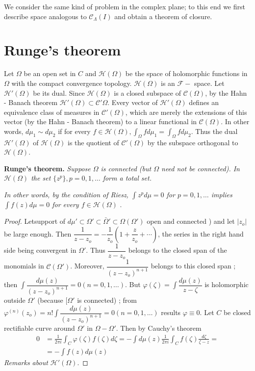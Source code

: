 We consider the same kind of problem in the complex plane; to this end
we first describe space analogous to $\mathscr{C}_\Lambda (I)$ and
obtain a theorem of closure. 

\section{Runge's theorem}\label{chap8:sec2}%

Let $\Omega$ be an open set in $C$ and $\mathscr{H}(\Omega)$ be the
space of holomorphic functions in $\Omega$ with the compact
convergence topology. $\mathscr{H}(\Omega)$ is an $\mathcal{F}-$
space. Let $\mathscr{H}' (\Omega)$ be its dual. Since
$\mathscr{H}(\Omega)$ is a closed subspace of $\mathscr{C}(\Omega)$,
by the Hahn - Banach theorem $\mathscr{H}' (\Omega) \subset
\mathscr{C}' \Omega$. Every vector of $\mathscr{H}'(\Omega)$ defines
an equivalence class of measures in $\mathscr{C}'(\Omega)$, which are
merely the extensions of this vector (by the Hahn - Banach theorem) to
a linear functional in $\mathscr{C}(\Omega)$. In other words, $d \mu_1
\sim d \mu_2$ if for every $f \in \mathscr{H}(\Omega), \int_\Omega f d
\mu_1 = \int_\Omega f d \mu_2$. Thus the dual $\mathscr{H}'(\Omega)$
of $\mathscr{H}(\Omega)$ is the quotient of $\mathscr{C}'(\Omega)$ by
the subspace orthogonal to $\mathscr{H}(\Omega)$. 

\medskip
\noindent
\textbf{Runge's theorem.} \textit{Suppose $\Omega$ is connected (but
 $\Omega$ need not be connected). In $\mathscr{H}(\Omega)$ the set
 $\{z^p\}, p = 0, 1,\ldots $ form a total set.} 

\textit{In other words, by the condition of Riesz, $\int z^p d \mu =
 0$ for $p = 0, 1, \ldots$ implies $\int f (z) d \mu = 0$ for every
 $f \in \mathscr{H}(\Omega)$ }. 

\begin{proof}
 Let\pageoriginale support of $d \mu ' \subset \Omega' \subset \bar{\Omega}'
 \subset \Omega (\Omega')$
 open and connected ) and let $|z_o|$ be large enough. Then
 $\dfrac{1}{z-z_o}= - \dfrac{1}{z_o} (1 + \dfrac{z}{z_o} +
 \cdots)$, the series in the right hand side being convergent in
 $\Omega'$. Thus $\dfrac{1}{z - z_o}$ belongs to the closed span of
 the monomials in $\mathscr{C}(\Omega')$. Moreover, $\dfrac{1}{(z- z_o)^{n +
  1}}$ belongs to this closed span ; then $\int \dfrac{d \mu
 (z)}{(z - z_o)^{n + 1}} = 0 (n = 0, 1, \ldots)$. But $\varphi
 (\zeta) = \int \dfrac{ d \mu (z)}{z - \zeta}$ is holomorphic outside
 $\Omega'$ (because $[\Omega'$ is connected) ; from $\varphi^{(n)}
 (z_o) = n ! \int \dfrac{ d \mu (z)}{(z - z_o)^{n + 1}} = 0 (n = 0,
 1, \ldots)$ results $\varphi \equiv 0$. Let $C$ be closed
 rectifiable curve around $\Omega'$ in $\Omega - \Omega'$. Then by
 Cauchy's theorem 
 \begin{align*}
  0 & = \frac{1}{2 \pi i} \int_C \varphi (\zeta) f (\zeta) d\zeta
  = - \int d \mu (z) \frac{1}{2 \pi i} \int_C f (\zeta) \frac{d
  \zeta}{\zeta - z}=\\ 
  & = - \int f (z) d\mu (z)
 \end{align*}
 \textit{Remarks about $\mathscr{H}' (\Omega)$}.
\end{proof}

